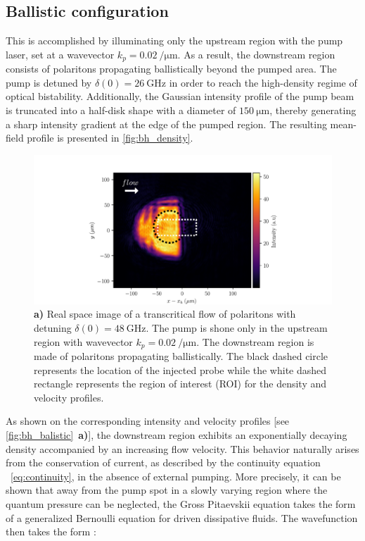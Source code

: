 \subsection{Ballistic configuration}
\label{sec:ballistic_configuration}
This is accomplished by illuminating only the upstream region with the pump laser, set at a wavevector \(k_p = \SI{0.02}{\per \micro \meter}\). As a result, the downstream region consists of polaritons propagating ballistically beyond the pumped area.
The pump is detuned by \(\delta(0) = \SI{26}{\giga \hertz}\) in order to reach the high-density regime of optical bistability. Additionally, the Gaussian intensity profile of the pump beam is truncated into a half-disk shape with a diameter of \(\SI{150}{\micro \meter}\), thereby generating a sharp intensity gradient at the edge of the pumped region. 
The resulting mean-field profile is presented in \autoref{fig:bh_density}.

\begin{figure}[htbp]
    \centering
    \includegraphics[width=1\textwidth]{chap_stimulated_hawking/fig/bh_density.pdf}
    \caption{\textbf{a)} Real space image of a transcritical flow of polaritons with detuning $\delta(0)=\SI{48}{\giga\hertz}$. The pump is shone only 
    in the upstream region with wavevector $k_p=\SI{0.02}{\per \micro \meter}$.
    The downstream region is made of polaritons propagating ballistically. The black dashed circle represents the location of the injected probe while the white dashed rectangle represents the region 
    of interest (ROI) for the density and velocity profiles. }
    \label{fig:bh_density}
\end{figure}

As shown on the corresponding intensity and velocity profiles [see \autoref{fig:bh_balistic}~\textbf{a)}], the downstream region exhibits an exponentially decaying density accompanied by an increasing flow velocity. 
This behavior naturally arises from the conservation of current, as described by the continuity equation ~\ref{eq:continuity}, in the absence of external pumping. More precisely, it can be shown that 
away from the pump spot in a slowly varying region where the quantum pressure can be neglected, the Gross Pitaevskii equation takes the form of a generalized Bernoulli equation for driven dissipative fluids. The wavefunction then takes the form \cite{carusotto_inhomogeneous_2008}: 

